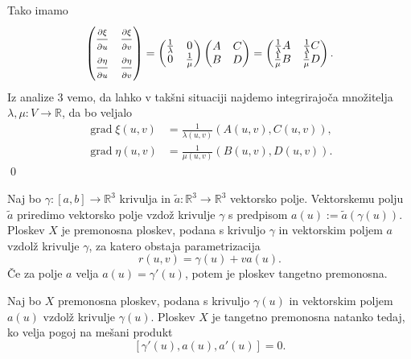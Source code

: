 Tako imamo \begin{equation*}
  \begin{pmatrix}
    \frac{ \strut\partial \xi }{ \strut\partial u }  & \frac{ \strut\partial \xi }{ \strut\partial v }  \\
    \frac{ \strut\partial \eta }{ \strut\partial u }  & \frac{ \strut\partial \eta }{ \strut\partial v } 
    \end{pmatrix} = \begin{pmatrix}
      \frac{1}{\lambda} & 0  \\ 0 & \frac{1}{\mu} 
      \end{pmatrix}\begin{pmatrix}
      A & C \\
      B & D
      \end{pmatrix} = \begin{pmatrix}
        \frac{1}{\lambda} A & \frac{1}{\lambda} C \\
        \frac{1}{\mu} B & \frac{1}{\mu} D
        \end{pmatrix}.
\end{equation*}  
Iz analize 3 vemo, da lahko v takšni situaciji najdemo integrirajoča množitelja $\lambda, \mu: V \to \mathbb{R}$, da bo veljalo \begin{align*}
  \operatorname{grad} \xi (u,v) &= \frac{1}{\lambda(u,v)}(A(u,v), C(u,v)), \\
  \operatorname{grad} \eta (u,v) &= \frac{1}{\mu(u,v)}(B(u,v), D(u,v)).
\end{align*}
\qed



\begin{definicija}
\label{def_premnosna_ploskev}
Naj bo $\gamma: [a,b] \to \mathbb{R}^3$ krivulja in $\tilde{a}: \mathbb{R}^3 \to \mathbb{R}^3$ vektorsko polje. 
Vektorskemu polju $\tilde{a}$ priredimo vektorsko polje vzdož krivulje $\gamma$ s predpisom $a(u) := \tilde{a}(\gamma(u))$. 
Ploskev $X$ je premonosna ploskev, podana s krivuljo $\gamma$ in vektorskim poljem $a$ vzdolž krivulje $\gamma$, za katero obstaja parametrizacija \begin{equation*}
r(u, v) = \gamma(u) + va(u).
\end{equation*}Če za polje $a$ velja $a(u) = \gamma'(u)$, potem je ploskev tangetno premonosna.
\end{definicija}


\begin{lema}
\label{lem_tangentno_premonosna_mesani_produkt}
Naj bo $X$ premonosna ploskev, podana s krivuljo $\gamma(u)$ in vektorskim poljem $a(u)$ vzdolž krivulje $\gamma(u)$. Ploskev $X$ je
tangetno premonosna natanko tedaj, ko velja pogoj na mešani produkt \begin{equation*}
\left[ \gamma'(u), a(u), a'(u) \right] = 0.
\end{equation*}  
\noindent
\end{lema}

